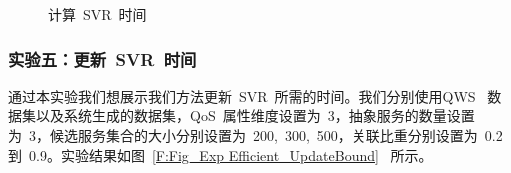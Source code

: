 \begin{figure}[!thb]
 \begin{minipage}[b]{1\linewidth} %
    \centering
    \hspace{0.05in}
    \caption{计算~SVR~时间}
    \label{F:Fig_Exp Efficient_Bound}
  \end{minipage}%
\end{figure}

\subsubsection{实验五：更新~SVR~时间}

通过本实验我们想展示我们方法更新~SVR~所需的时间。我们分别使用QWS~ 数据集以及系统生成的数据集，QoS~属性维度设置为~3，抽象服务的数量设置为~3，候选服务集合的大小分别设置为~200,~300,~500，关联比重分别设置为~0.2 到~0.9。实验结果如图~\ref{F:Fig_Exp Efficient_UpdateBound}~ 所示。

